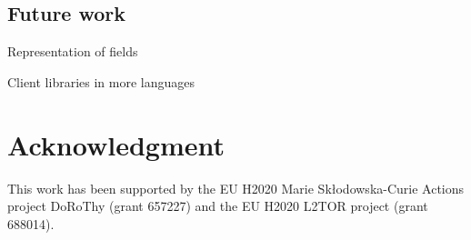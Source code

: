 \documentclass[letterpaper, 10 pt, conference]{ieeeconf}  %
\begin{document}
\subsection{Future work}

Representation of fields

Client libraries in more languages

\section*{Acknowledgment}

This work has been supported by the EU H2020 Marie Sk\l odowska-Curie Actions
project DoRoThy (grant 657227) and the EU H2020 L2TOR project (grant 688014).




\end{document}
